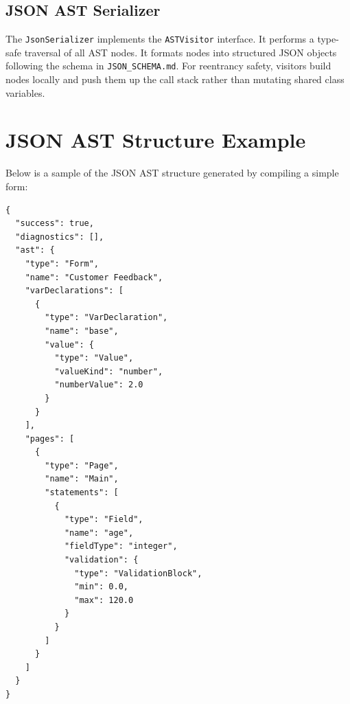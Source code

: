 \documentclass[10pt,a4paper]{article}
\begin{document}
\subsection{JSON AST Serializer}
The \texttt{JsonSerializer} implements the \texttt{ASTVisitor} interface. It performs a type-safe traversal of all AST nodes. It formats nodes into structured JSON objects following the schema in \texttt{JSON\_SCHEMA.md}. For reentrancy safety, visitors build nodes locally and push them up the call stack rather than mutating shared class variables.

\section{JSON AST Structure Example}
Below is a sample of the JSON AST structure generated by compiling a simple form:
\begin{lstlisting}
{
  "success": true,
  "diagnostics": [],
  "ast": {
    "type": "Form",
    "name": "Customer Feedback",
    "varDeclarations": [
      {
        "type": "VarDeclaration",
        "name": "base",
        "value": {
          "type": "Value",
          "valueKind": "number",
          "numberValue": 2.0
        }
      }
    ],
    "pages": [
      {
        "type": "Page",
        "name": "Main",
        "statements": [
          {
            "type": "Field",
            "name": "age",
            "fieldType": "integer",
            "validation": {
              "type": "ValidationBlock",
              "min": 0.0,
              "max": 120.0
            }
          }
        ]
      }
    ]
  }
}
\end{lstlisting}
\end{document}
